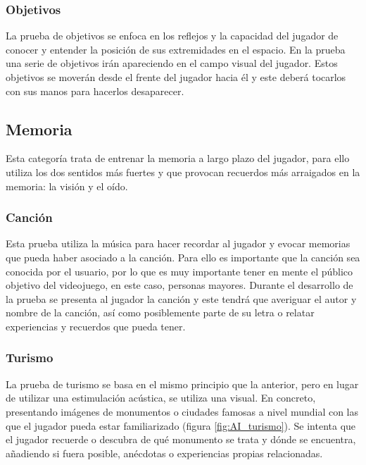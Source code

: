 \subsubsection{Objetivos}

La prueba de objetivos se enfoca en los reflejos y la capacidad del jugador de conocer y entender la posición de sus extremidades en el espacio. En la prueba una serie de objetivos irán apareciendo en el campo visual del jugador. Estos objetivos se moverán desde el frente del jugador hacia él y este deberá tocarlos con sus manos para hacerlos desaparecer.



\subsection{Memoria}

Esta categoría trata de entrenar la memoria a largo plazo del jugador, para ello utiliza los dos sentidos más fuertes y que provocan recuerdos más arraigados en la memoria: la visión y el oído. 

\subsubsection{Canción}

Esta prueba utiliza la música para hacer recordar al jugador y evocar memorias que pueda haber asociado a la canción. Para ello es importante que la canción sea conocida por el usuario, por lo que es muy importante tener en mente el público objetivo del videojuego, en este caso, personas mayores. 
Durante el desarrollo de la prueba se presenta al jugador la canción y este tendrá que averiguar el autor y nombre de la canción, así como posiblemente parte de su letra o relatar experiencias y recuerdos que pueda tener.

\subsubsection{Turismo}
La prueba de turismo se basa en el mismo principio que la anterior, pero en lugar de utilizar una estimulación acústica, se utiliza una visual. En concreto, presentando imágenes de monumentos o ciudades famosas a nivel mundial con las que el jugador pueda estar familiarizado (figura \ref{fig:AI_turismo}). Se intenta que el jugador recuerde o descubra de qué monumento se trata y dónde se encuentra, añadiendo si fuera posible, anécdotas o experiencias propias relacionadas.


